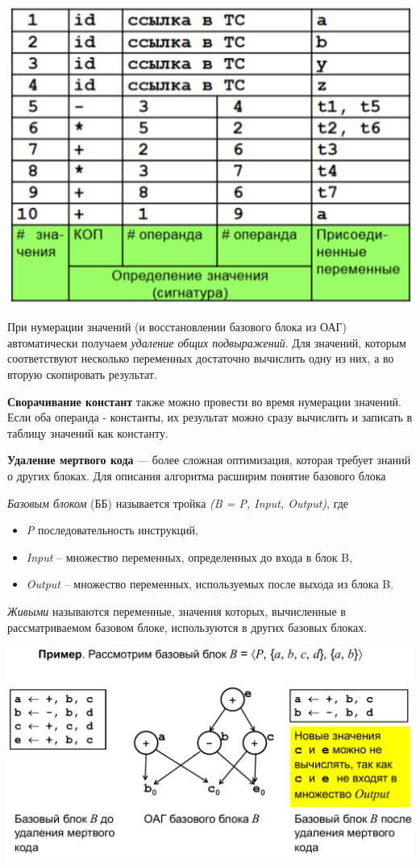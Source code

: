 \includegraphics[width=\columnwidth]{pics/table.png}

При нумерации значений (и восстановлении базового блока из ОАГ) автоматически получаем \textit{удаление общих подвыражений}. Для значений, которым соответствуют несколько переменных достаточно вычислить одну из них, а во вторую скопировать результат.

\textbf{Сворачивание констант} также можно провести во время нумерации значений. Если оба операнда - константы, их результат можно сразу вычислить и записать в таблицу значений как константу.

\textbf{Удаление мертвого кода} --- более сложная оптимизация, которая требует знаний о других блоках. Для описания алгоритма расширим понятие базового блока

\textit{Базовым блоком} (ББ) называется тройка \textit{(B = P, Input, Output)}, где 
\begin{itemize}
    \item \textit{P} последовательность инструкций, 
    \item \textit{Input} – множество переменных, определенных до входа в блок B, 
    \item \textit{Output} – множество переменных, используемых после выхода из блока B.
\end{itemize}

\textit{Живыми} называются переменные, значения которых, вычисленные в рассматриваемом базовом блоке, используются в других базовых блоках.

\includegraphics[width=0.8\columnwidth]{pics/dead_code.png}

